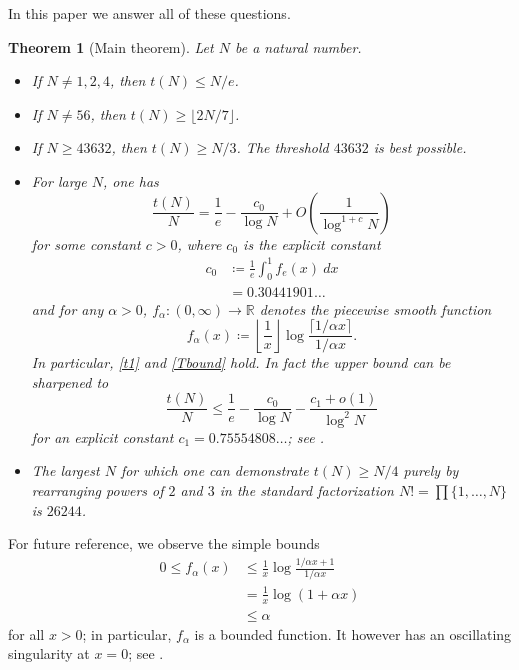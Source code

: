 \documentclass[12pt,a4paper,reqno]{amsart}
\numberwithin{equation}{section}
\theoremstyle{plain}
\newtheorem{theorem}{Theorem}[section]
\theoremstyle{definition}
\newcommand\R{\mathbb{R}}
\begin{document}
In this paper we answer all of these questions.

\begin{theorem}[Main theorem]\label{main} Let $N$ be a natural number.
\begin{itemize}
\item[(i)] If $N \neq 1,2,4$, then $t(N) \leq N/e$.
\item[(ii)]  If $N \neq 56$, then $t(N) \geq \lfloor 2N/7 \rfloor$.
\item[(iii)]  If $N \geq 43632$, then $t(N) \geq N/3$.  The threshold $43632$ is best possible.
\item[(iv)]  For large $N$, one has
  \begin{equation}\label{asym}
    \frac{t(N)}{N} = \frac{1}{e} - \frac{c_0}{\log N} + O\left( \frac{1}{\log^{1+c} N} \right)
  \end{equation}
for some constant $c>0$, where $c_0$ is the explicit constant
\begin{equation}\label{c0-def}
  \begin{split}
  c_0 &\coloneqq \frac{1}{e} \int_0^1 f_e(x)\ dx \\
  &= 0.30441901\dots
\end{split}
\end{equation}
and for any $\alpha>0$, $f_\alpha \colon (0,\infty) \to \R$ denotes the piecewise smooth function
\begin{equation}\label{falpha-def} 
  f_\alpha(x) \coloneqq \left\lfloor \frac{1}{x} \right\rfloor \log \frac{\lceil 1/\alpha x \rceil}{1/\alpha x}.
\end{equation}
In particular, \eqref{t1} and \eqref{Tbound} hold.  In fact the upper bound can be sharpened to
\begin{equation}\label{tna} 
  \frac{t(N)}{N} \leq \frac{1}{e} - \frac{c_0}{\log N} - \frac{c_1+o(1)}{\log^2 N} 
\end{equation}
for an explicit constant $c_1=0.75554808\dots$; see .
\item[(v)]  The largest $N$ for which one can demonstrate $t(N) \geq N/4$ purely by rearranging powers of $2$ and $3$ in the standard factorization $N! = \prod \{1,\dots,N\}$ is $26244$.
\end{itemize}
\end{theorem}

For future reference, we observe the simple bounds
\begin{equation}\label{falpha-bound}
 \begin{split}
   0 \leq f_\alpha(x) &\leq \frac{1}{x} \log \frac{1/\alpha x+1}{1/\alpha x}\\
&= \frac{1}{x} \log\left( 1 + \alpha x \right) \\
&\leq \alpha
\end{split}
\end{equation}
for all $x>0$; in particular, $f_\alpha$ is a bounded function.  It however has an oscillating singularity at $x=0$; see .
\end{document}
